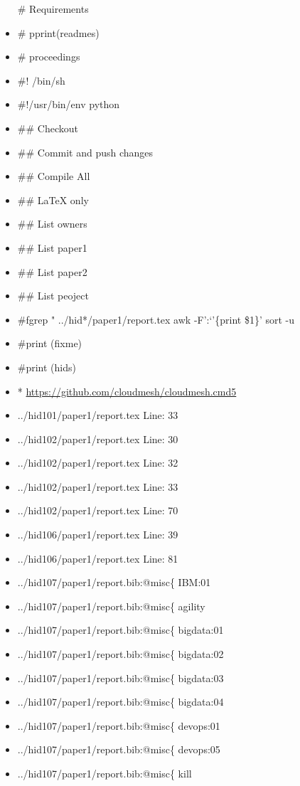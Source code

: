 \begin{itemize}
  \# Requirements
\item
  \# pprint(readmes)
\item
  \# proceedings
\item
  \#! /bin/sh
\item
  \#!/usr/bin/env python
\item
  \#\# Checkout
\item
  \#\# Commit and push changes
\item
  \#\# Compile All
\item
  \#\# LaTeX only
\item
  \#\# List owners
\item
  \#\# List paper1
\item
  \#\# List paper2
\item
  \#\# List peoject
\item
  \#fgrep " ../hid*/paper1/report.tex \textbar{} awk -F':`'\{print
  \$1\}' \textbar{} sort -u
\item
  \#print (fixme)
\item
  \#print (hids)
\item
  * \url{https://github.com/cloudmesh/cloudmesh.cmd5}
\item
  ../hid101/paper1/report.tex Line: 33
\item
  ../hid102/paper1/report.tex Line: 30
\item
  ../hid102/paper1/report.tex Line: 32
\item
  ../hid102/paper1/report.tex Line: 33
\item
  ../hid102/paper1/report.tex Line: 70
\item
  ../hid106/paper1/report.tex Line: 39
\item
  ../hid106/paper1/report.tex Line: 81
\item
  ../hid107/paper1/report.bib:@misc\{ IBM:01
\item
  ../hid107/paper1/report.bib:@misc\{ agility
\item
  ../hid107/paper1/report.bib:@misc\{ bigdata:01
\item
  ../hid107/paper1/report.bib:@misc\{ bigdata:02
\item
  ../hid107/paper1/report.bib:@misc\{ bigdata:03
\item
  ../hid107/paper1/report.bib:@misc\{ bigdata:04
\item
  ../hid107/paper1/report.bib:@misc\{ devops:01
\item
  ../hid107/paper1/report.bib:@misc\{ devops:05
\item
  ../hid107/paper1/report.bib:@misc\{ kill

\end{itemize}
